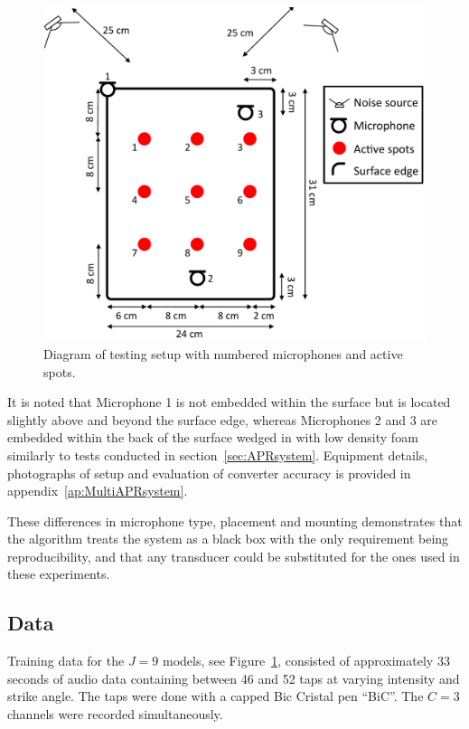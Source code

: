 \begin{figure} %
\begin{minipage}[b]{1.0\linewidth}
  \centering
  \centerline{\includegraphics[width=12cm]{MultiAPRsystem2.pdf}}
\end{minipage}
\caption{Diagram of testing setup with numbered microphones and active spots.}
\label{fig:MultiAPRsystem.pdf}
\end{figure}

It is noted that Microphone 1 is not embedded within the surface but is located slightly above and beyond the surface edge, whereas Microphones 2 and 3 are embedded within the back of the surface wedged in with low density foam similarly to tests conducted in section~\ref{sec:APRsystem}. Equipment details, photographs of setup and evaluation of converter accuracy is provided in appendix~\ref{ap:MultiAPRsystem}.

These differences in microphone type, placement and mounting demonstrates that the algorithm treats the system as a black box with the only requirement being reproducibility, and that any transducer could be substituted for the ones used in these experiments.

\subsection{Data}
Training data for the $J=9$ models, see Figure~\ref{fig:MultiAPRsystem.pdf}, consisted of approximately 33 seconds of audio data containing between 46 and 52 taps at varying intensity and strike angle. The taps were done with a capped Bic Cristal pen ``BiC\textregistered''. The $C=3$ channels were recorded simultaneously.

